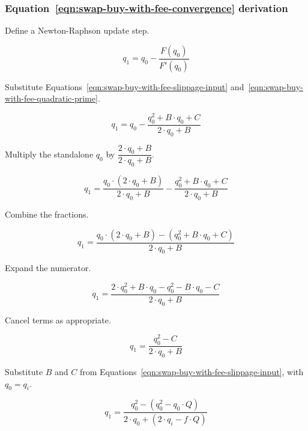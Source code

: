 \subsubsection{Equation~\ref{eqn:swap-buy-with-fee-convergence} derivation}%
\label{sssec:equation-eqn-swap-buy-with-fee-convergence-derivation}

Define a Newton-Raphson update step.

\begin{equation*}
	q_1 = q_0 -\frac{F(q_0)}{F'(q_0)}
\end{equation*}

Substitute Equations~\ref{eqn:swap-buy-with-fee-slippage-input}
and~\ref{eqn:swap-buy-with-fee-quadratic-prime}.

\begin{equation*}
	q_1 = q_0 -\frac{q_0^2 + B \cdot q_0 + C}{2 \cdot q_0 + B}
\end{equation*}

Multiply the standalone $q_0$ by $\dfrac{2 \cdot q_0 + B}{2 \cdot q_0 + B}$.

\begin{equation*}
	q_1 = \frac{q_0 \cdot (2 \cdot q_0 + B)}{2 \cdot q_0 + B} -
	\frac{q_0^2 + B \cdot q_0 + C}{2 \cdot q_0 + B}
\end{equation*}

Combine the fractions.

\begin{equation*}
	q_1 = \frac{q_0 \cdot (2 \cdot q_0 + B) - (q_0^2 + B \cdot q_0 + C)}{2 \cdot q_0 + B}
\end{equation*}

Expand the numerator.

\begin{equation*}
	q_1 = \frac{2 \cdot q_0^2 + B \cdot q_0 - q_0^2 - B \cdot q_0 - C}{2 \cdot q_0 + B}
\end{equation*}

Cancel terms as appropriate.

\begin{equation*}
	q_1 = \frac{q_0^2 - C}{2 \cdot q_0 + B}
\end{equation*}

Substitute $B$ and $C$ from Equations~\ref{eqn:swap-buy-with-fee-slippage-input}, with
$q_0 = q_i$.

\begin{equation*}
	q_1 = \frac{q_0^2 - (q_0^2 - q_0 \cdot Q)}{2 \cdot q_0 + (2 \cdot q_i - f \cdot Q)}
\end{equation*}

